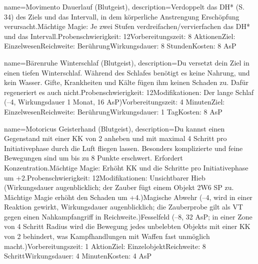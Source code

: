 {
    name={Movimento Dauerlauf (Blutgeist)},
    description={Verdoppelt das DH* (S. 34) des Ziels und das Intervall, in dem körperliche Anstrengung Erschöpfung verursacht.\newline Mächtige Magie: Je zwei Stufen verdreifachen/vervierfachen das DH* und das Intervall.\newline Probenschwierigkeit: 12\newline Vorbereitungszeit: 8 Aktionen\newline Ziel: Einzelwesen\newline Reichweite: Berührung\newline Wirkungsdauer: 8 Stunden\newline Kosten: 8 AsP}
}


{
    name={Bärenruhe Winterschlaf (Blutgeist)},
    description={Du versetzt dein Ziel in einen tiefen Winterschlaf. Während des Schlafes benötigt es keine Nahrung, und kein Wasser. Gifte, Krankheiten und Kälte fügen ihm keinen Schaden zu. Dafür regeneriert es auch nicht.\newline Probenschwierigkeit: 12\newline Modifikationen: Der lange Schlaf (–4, Wirkungsdauer 1 Monat, 16 AsP)\newline Vorbereitungszeit: 4 Minuten\newline Ziel: Einzelwesen\newline Reichweite: Berührung\newline Wirkungsdauer: 1 Tag\newline Kosten: 8 AsP}
}


{
    name={Motoricus Geisterhand (Blutgeist)},
    description={Du kannst einen Gegenstand mit einer KK von 2 anheben und mit maximal 4 Schritt pro Initiativephase durch die Luft fliegen lassen. Besonders komplizierte und feine Bewegungen sind um bis zu 8 Punkte erschwert. Erfordert Konzentration.\newline Mächtige Magie: Erhöht KK und die Schritte pro Initiativephase um +2.\newline Probenschwierigkeit: 12\newline Modifikationen: Unsichtbarer Hieb (Wirkungsdauer augenblicklich; der Zauber fügt einem Objekt 2W6 SP zu. Mächtige Magie erhöht den Schaden um +4.)\newline Magische Abwehr (–4, wird in einer Reaktion gewirkt, Wirkungsdauer augenblicklich; die Zauberprobe gilt als VT gegen einen Nahkampfangriff in Reichweite.)\newline Fesselfeld (–8, 32 AsP; in einer Zone von 4 Schritt Radius wird die Bewegung jedes unbelebten Objekts mit einer KK von 2 behindert, was Kampfhandlungen mit Waffen fast unmöglich macht.)\newline Vorbereitungszeit: 1 Aktion\newline Ziel: Einzelobjekt\newline Reichweite: 8 Schritt\newline Wirkungsdauer: 4 Minuten\newline Kosten: 4 AsP}
}


